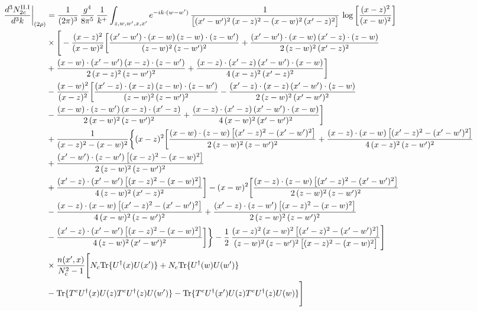 \documentclass[9pt]{article}
\numberwithin{equation}{section}
\begin{document}
\begin{align}
\frac{d^{3}N^{\rm II.I}_{2c}}{d^{3}k}\bigg|_{(2\rho)} &= \frac{1}{(2\pi)^{3}}\,\frac{g^{4}}{8\pi^{5}}\,\frac{1}{k^{+}}\int_{z,w,w^{\prime},x,x^{\prime}}e^{-ik\cdot(w-w^{\prime})}\,\frac{1}{\big[(x^{\prime}-w^{\prime})^{2}\,(x-z)^{2}-(x-w)^{2}\,(x^{\prime}-z)^{2}\big]}\,\log\left[\frac{(x-z)^{2}}{(x-w)^{2}}\right]\notag\\
&\times\Bigg[-\frac{(x-z)^{2}}{(x-w)^{2}}\bigg[\frac{(x^{\prime}-w^{\prime})\cdot(x-w)\,(z-w)\cdot(z-w^{\prime})}{(z-w)^{2}\,(z-w^{\prime})^{2}}+\frac{(x^{\prime}-w^{\prime})\cdot(x-w)\,(x^{\prime}-z)\cdot(z-w)}{2\,(z-w)^{2}\,(x^{\prime}-z)^{2}}\notag \\ & +\frac{(x-w)\cdot(x^{\prime}-w^{\prime})\,(x-z)\cdot(z-w^{\prime})}{2\,(x-z)^{2}\,(z-w^{\prime})^{2}}+\frac{(x-z)\cdot(x^{\prime}-z)\,(x^{\prime}-w^{\prime})\cdot(x-w)}{4\,(x-z)^{2}\,(x^{\prime}-z)^{2}}\bigg]\notag\\
&-\frac{(x-w)^{2}}{(x-z)^{2}}\bigg[\frac{(x^{\prime}-z)\cdot(x-z)\,(z-w)\cdot(z-w^{\prime})}{(z-w)^{2}\,(z-w^{\prime})^{2}}-\frac{(x^{\prime}-z)\cdot(x-z)\,(x^{\prime}-w^{\prime})\cdot(z-w)}{2\,(z-w)^{2}\,(x^{\prime}-w^{\prime})^{2}}\notag \\ & -\frac{(x-w)\cdot(z-w^{\prime})\,(x-z)\cdot(x^{\prime}-z)}{2\,(x-w)^{2}\,(z-w^{\prime})^{2}}+\frac{(x-z)\cdot(x^{\prime}-z)\,(x^{\prime}-w^{\prime})\cdot(x-w)}{4\,(x-w)^{2}\,(x^{\prime}-w^{\prime})^{2}}\bigg]\notag\\
&+\frac{1}{(x-z)^{2}-(x-w)^{2}}\bigg\{(x-z)^{2}\bigg[\frac{(x-w)\cdot(z-w)\,\big[(x^{\prime}-z)^{2}-(x^{\prime}-w^{\prime})^{2}\big]}{2\,(z-w)^{2}\,(z-w^{\prime})^{2}}+\frac{(x-z)\cdot(x-w)\,\big[(x^{\prime}-z)^{2}-(x^{\prime}-w^{\prime})^{2}\big]}{4\,(x-z)^{2}\,(z-w^{\prime})^{2}}\notag\\ &+\frac{(x^{\prime}-w^{\prime})\cdot(z-w^{\prime})\,\big[(x-z)^{2}-(x-w)^{2}\big]}{2\,(z-w)^{2}\,(z-w^{\prime})^{2}}\notag \\ & +\frac{(x^{\prime}-z)\cdot(x^{\prime}-w^{\prime})\,\big[(x-z)^{2}-(x-w)^{2}\big]}{4\,(z-w)^{2}\,(x^{\prime}-z)^{2}}\bigg]-(x-w)^{2}\bigg[\frac{(x-z)\cdot(z-w)\,\big[(x^{\prime}-z)^{2}-(x^{\prime}-w^{\prime})^{2}\big]}{2\,(z-w)^{2}\,(z-w^{\prime})^{2}}\notag \\ & -\frac{(x-z)\cdot(x-w)\,\big[(x^{\prime}-z)^{2}-(x^{\prime}-w^{\prime})^{2}\big]}{4\,(x-w)^{2}\,(z-w^{\prime})^{2}}+\frac{(x^{\prime}-z)\cdot(z-w^{\prime})\,\big[(x-z)^{2}-(x-w)^{2}\big]}{2\,(z-w)^{2}\,(z-w^{\prime})^{2}}\notag \\ & -\frac{(x^{\prime}-z)\cdot(x^{\prime}-w^{\prime})\,\big[(x-z)^{2}-(x-w)^{2}\big]}{4\,(z-w)^{2}\,(x^{\prime}-w^{\prime})^{2}}\bigg]\bigg\}-\frac{1}{2}\,\frac{(x-z)^{2}\,(x-w)^{2}\,\big[(x^{\prime}-z)^{2}-(x^{\prime}-w^{\prime})^{2}\big]}{(z-w)^{2}\,(z-w^{\prime})^{2}\,\big[(x-z)^{2}-(x-w)^{2}\big]}\Bigg]\notag\\ &\times\frac{n(x',x)}{N_{c}^{2}-1}\Bigg[N_{c}{\rm Tr}\{U^{\dagger}(x)U(x')\}+N_{c}{\rm Tr}\{U^{\dagger}(w)U(w')\}\notag\\ &-{\rm Tr}\{T^{e}U^{\dagger}(x)U(z)T^{e}U^{\dagger}(z)U(w')\}-{\rm Tr}\{T^{e}U^{\dagger}(x')U(z)T^{e}U^{\dagger}(z)U(w)\}\Bigg]\\

\end{align}
\end{document}
